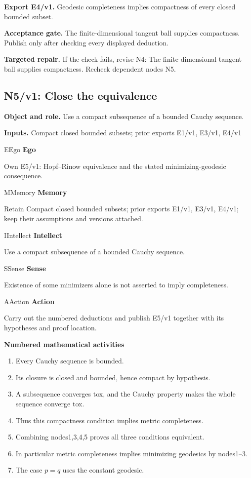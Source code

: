 \documentclass[preprint,12pt,aps,pra,showkeys,amsmath,amssymb,superscriptaddress,floatfix]{revtex4-2}
\theoremstyle{definition}
\theoremstyle{remark}
\newcommand{\mmfaculty}[3]{%
 \begin{mmfacultybox}{#1}{#2}
 {\sffamily\bfseries\color{MMBlue}#2}\par\smallskip #3
 \end{mmfacultybox}}
\newcommand{\field}[2]{\par\smallskip\noindent\textbf{#1.} #2\par}
\begin{document}
\field{Export E4/v1}{Geodesic completeness implies compactness of every closed bounded
subset.}

\field{Acceptance gate}{The finite-dimensional tangent ball supplies compactness. Publish only
after checking every displayed deduction.}

\field{Targeted repair}{If the check fails, revise N4: The finite-dimensional tangent ball
supplies compactness. Recheck dependent nodes N5.}

\clearpage

\subsection{N5/v1: Close the equivalence}

\field{Object and role}{Use a compact subsequence of a bounded Cauchy sequence.}

\field{Inputs}{Compact closed bounded subsets; prior exports E1/v1, E3/v1, E4/v1}

\mmfaculty{E}{Ego}{Own E5/v1: Hopf--Rinow equivalence and the stated minimizing-geodesic
consequence.}

\mmfaculty{M}{Memory}{Retain Compact closed bounded subsets; prior exports E1/v1, E3/v1,
E4/v1; keep their assumptions and versions attached.}

\mmfaculty{I}{Intellect}{Use a compact subsequence of a bounded Cauchy sequence.}

\mmfaculty{S}{Sense}{Existence of some minimizers alone is not asserted to imply
completeness.}

\mmfaculty{A}{Action}{Carry out the numbered deductions and publish E5/v1 together with its
hypotheses and proof location.}

\smallskip\noindent\textbf{Numbered mathematical activities}

\begin{enumerate}[label=N5.\arabic*,leftmargin=3.4em]

\item Every Cauchy sequence is bounded.

\item Its closure is closed and bounded, hence compact by hypothesis.

\item A subsequence converges tox, and the Cauchy property makes the whole
sequence converge tox.

\item Thus this compactness condition implies metric completeness.

\item Combining nodes1,3,4,5 proves all three conditions equivalent.

\item In particular metric completeness implies minimizing geodesics by
nodes1--3.

\item The case \(p=q\) uses the constant geodesic.

\end{enumerate}
\end{document}
